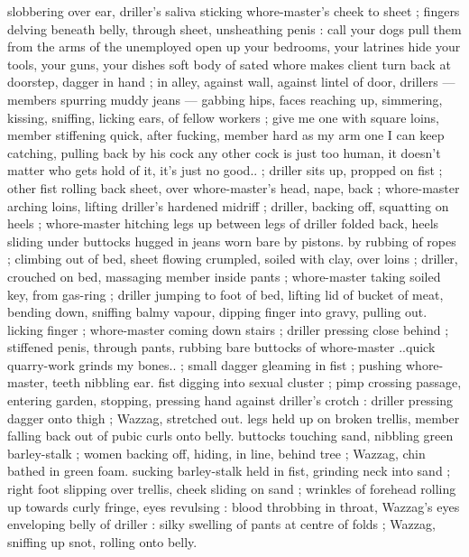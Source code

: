 slobbering over ear, driller's saliva sticking whore-master's cheek to 
sheet ; fingers delving beneath belly, through sheet, unsheathing 
penis :{\td} {\gl} call your dogs{\thd} pull them from the arms of the 
unemployed{\thd} open up your bedrooms, your latrines{\thd} hide your 
tools, your guns, your dishes{\thd} soft body of sated whore makes 
client turn back at doorstep, dagger in hand{\td} {\gr} ; in alley, against wall, 
against lintel of door, drillers --- members spurring muddy jeans --- 
gabbing hips, faces reaching up, simmering, kissing, sniffing, licking 
ears, of fellow workers ; {\thd} {\gl}{\td} give me one with square loins, member 
stiffening quick, after fucking, member hard as my arm{\td} one I can 
keep catching, pulling back by his cock{\td} any other cock is just too 
human, it doesn't matter who gets hold of it, it's just no good..{\gr} ; 
driller sits up, propped on fist ; other fist rolling back sheet, over 
whore-master's head, nape, back ; whore-master arching loins, lifting 
driller's hardened midriff ; driller, backing off, squatting on heels ; 
whore-master hitching legs up between legs of driller folded back, 
heels sliding under buttocks hugged in jeans worn bare by pistons. 
by rubbing of ropes ; climbing out of bed, sheet flowing crumpled, 
soiled with clay, over loins ; driller, crouched on bed, massaging 
member inside pants ; whore-master taking soiled key, from gas-ring 
; driller jumping to foot of bed, lifting lid of bucket of meat, bending 
down, sniffing balmy vapour, dipping finger into gravy, pulling out. 
licking finger ; whore-master coming down stairs ; driller pressing 
close behind ; stiffened penis, through pants, rubbing bare buttocks 
of whore-master{\td} {\gl}..quick{\thd} quarry-work grinds my bones..{\gr} ; small 
dagger gleaming in fist ; pushing whore-master, teeth nibbling ear. 
fist digging into sexual cluster ; pimp crossing passage, entering 
garden, stopping, pressing hand against driller's crotch : driller 
pressing dagger onto thigh ; Wazzag, stretched out. legs held up on 
broken trellis, member falling back out of pubic curls onto belly. 
buttocks touching sand, nibbling green barley-stalk ; women backing 
off, hiding, in line, behind tree ; Wazzag, chin bathed in green foam. 
sucking barley-stalk held in fist, grinding neck into sand ; right foot 
slipping over trellis, cheek sliding on sand ; wrinkles of forehead 
rolling up towards curly fringe, eyes revulsing : blood throbbing in 
throat, Wazzag's eyes enveloping belly of driller : silky swelling of 
pants at centre of folds ; Wazzag, sniffing up snot, rolling onto belly. 
